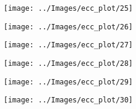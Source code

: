\begin{figure}[!htbp]

  \begin{minipage}{0.3\textwidth} \centering
    \texttt{[image: ../Images/ecc\_plot/25]}
  \end{minipage}
  \begin{minipage}{0.3\textwidth} \centering
    \texttt{[image: ../Images/ecc\_plot/26]}
  \end{minipage}
  \begin{minipage}{0.3\textwidth} \centering
    \texttt{[image: ../Images/ecc\_plot/27]}
  \end{minipage}
\end{figure}

\begin{figure}[!htbp]

  \begin{minipage}{0.3\textwidth} \centering
    \texttt{[image: ../Images/ecc\_plot/28]}
  \end{minipage}
  \begin{minipage}{0.3\textwidth} \centering
    \texttt{[image: ../Images/ecc\_plot/29]}
  \end{minipage}
  \begin{minipage}{0.3\textwidth} \centering
    \texttt{[image: ../Images/ecc\_plot/30]}
  \end{minipage}
\end{figure}

